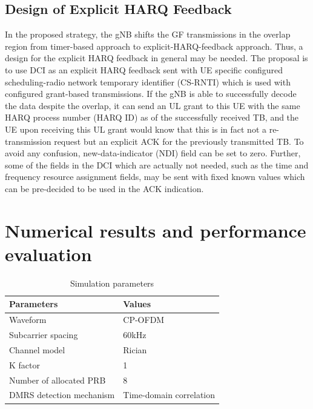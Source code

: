 \documentclass[conference]{IEEEtran}
\begin{document}
\subsection{Design of Explicit HARQ Feedback}\label{IIDD}
In the proposed strategy, the gNB shifts the GF transmissions in the overlap region from timer-based approach to explicit-HARQ-feedback approach. Thus, a design for the explicit HARQ feedback in general may be needed. The proposal is to use DCI as an explicit HARQ feedback sent with UE specific configured scheduling-radio network temporary identifier (CS-RNTI) which is used with configured grant-based transmissions. If the gNB is able to successfully decode the data despite the overlap, it can send an UL grant to this UE with the same HARQ process number (HARQ ID) as of the successfully received TB, and the UE upon receiving this UL grant would know that this is in fact not a re-transmission request but an explicit ACK for the previously transmitted TB. To avoid any confusion, new-data-indicator (NDI) field can be set to zero. Further, some of the fields in the DCI which are actually not needed, such as the time and frequency resource assignment fields, may be sent with fixed known values which can be pre-decided to be used in the ACK indication.

\section{Numerical results and performance evaluation}\label{III}


\begin{table}[htbp]
\caption{Simulation parameters}
\begin{center}
\begin{tabular}{|p{8em}|p{8em}|}
 \hline
 \textbf{Parameters} & \textbf{Values}\\
 \hline
 Waveform & CP-OFDM\\
 \hline
 Subcarrier spacing & 60kHz\\
 \hline
 Channel model & Rician\\
 \hline
 K factor & 1\\
 \hline
 Number of allocated PRB & 8\\
 \hline
 DMRS detection mechanism & Time-domain correlation\\
 

 
 \hline
\end{tabular}
\label{tab1}
\end{center}
\vspace{-8mm}
\end{table}
\end{document}
